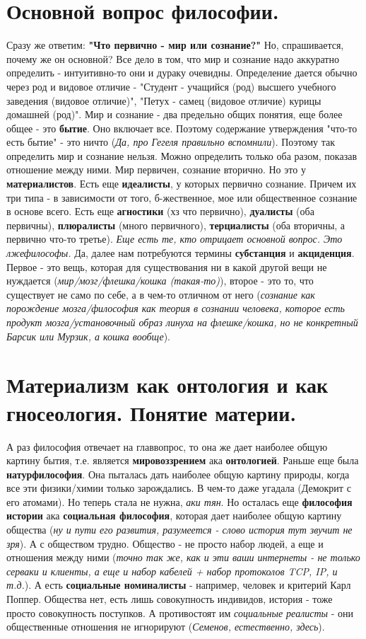 \section{ Основной вопрос философии.}
Сразу же ответим: \textbf{"Что первично - мир или сознание?"} Но, спрашивается, почему же он основной? Все дело в том, что мир и сознание надо аккуратно определить - интуитивно-то они и дураку очевидны. Определение дается обычно через род и видовое отличие - "Студент - учащийся (род) высшего учебного заведения (видовое отличие)", "Петух - самец (видовое отличие) курицы домашней (род)". Мир и сознание - два предельно общих понятия, еще более общее - это \textbf{бытие}. Оно включает все. Поэтому содержание утверждения "что-то есть бытие" - это ничто (\textit{Да, про Гегеля правильно вспомнили}). Поэтому так определить мир и сознание нельзя. Можно определить только оба разом, показав отношение между ними. Мир первичен, сознание вторично. Но это у \textbf{материалистов}. Есть еще \textbf{идеалисты}, у которых первично сознание. Причем их три типа - в зависимости от того, б-жественное, мое или общественное сознание в основе всего. Есть еще \textbf{агностики} (хз что первично), \textbf{дуалисты} (оба первичны), \textbf{плюралисты} (много первичного), \textbf{терциалисты} (оба вторичны, а первично что-то третье). \textit{Еще есть те, кто отрицает основной вопрос. Это лжефилософы.} Да, далее нам потребуются термины \textbf{субстанция} и \textbf{акциденция}. Первое - это вещь, которая для существования ни в какой другой вещи не нуждается (\textit{мир/мозг/флешка/кошка (такая-то)}), второе - это то, что существует не само по себе, а в чем-то отличном от него (\textit{сознание как порождение мозга/философия как теория в сознании человека, которое есть продукт мозга/установочный образ линуха на флешке/кошка, но не конкретный Барсик или Мурзик, а кошка вообще}).

\section{ Материализм как онтология и как гносеология. Понятие материи.}
А раз философия отвечает на главвопрос, то она же дает наиболее общую картину бытия, т.е. является \textbf{мировоззрением} ака \textbf{онтологией}. Раньше еще была \textbf{натурфилософия}. Она пыталась дать наиболее общую картину природы, когда все эти физики/химии только зарождались. В чем-то даже угадала (Демокрит с его атомами). Но теперь стала не нужна, \textit{аки тян}. Но осталась еще \textbf{философия истории} ака \textbf{социальная философия}, которая дает наиболее общую картину общества (\textit{ну и пути его развития, разумеется - слово история тут звучит не зря}). А с обществом трудно. Общество - не просто набор людей, а еще и отношения между ними (\textit{точно так же, как и эти ваши интернеты - не только серваки и клиенты, а еще и набор кабелей + набор протоколов TCP, IP, и т.д.}). А есть \textbf{социальные номиналисты} - например, человек и критерий Карл Поппер. Общества нет, есть лишь совокупность индивидов, история - тоже просто совокупность поступков. А противостоят им \textit{социальные реалисты} - они общественные отношения не игнорируют (\textit{Семенов, естественно, здесь}).

